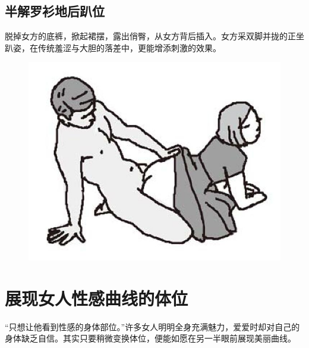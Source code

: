 \documentclass[12pt,UTF8]{ctexbook}
\begin{document}
\subsection{半解罗衫地后趴位}

脱掉女方的底裤，掀起裙摆，露出俏臀，从女方背后插入。女方采双脚并拢的正坐趴姿，在传统羞涩与大胆的落差中，更能增添刺激的效果。

\begin{figure}[htbp]
\centering
\includegraphics[width=0.7\linewidth]{tw32}
\caption{}
\label{fig:1}
\end{figure}

\section{展现女人性感曲线的体位}

“只想让他看到性感的身体部位。”许多女人明明全身充满魅力，爱爱时却对自己的身体缺乏自信。其实只要稍微变换体位，便能如愿在另一半眼前展现美丽曲线。

\subsection{}
\end{document}
